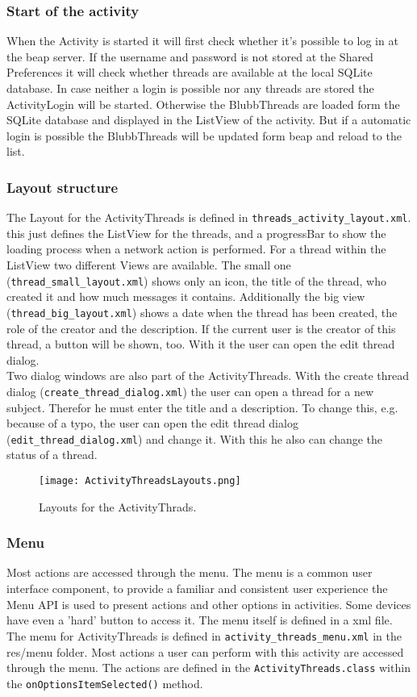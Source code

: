 \documentclass[12pt,a4paper,oneside]{report}
\newcommand{\code}[1]{\lstinline{#1}}
\begin{document}
\subsubsection{Start of the activity}
When the Activity is started it will first check whether it's possible to log in at the beap server. If the username and password is not stored at the Shared Preferences it will check whether threads are available at the local SQLite database. In case neither a login is possible nor any threads are stored the ActivityLogin will be started. Otherwise the BlubbThreads are loaded form the SQLite database and displayed in the ListView of the activity. But if a automatic login is possible the BlubbThreads will be updated form beap and reload to the list.

\subsubsection{Layout structure}
The Layout for the ActivityThreads is defined in \code{threads_activity_layout.xml}.
this just defines the ListView for the threads, and a progressBar to show the loading process when a network action is performed. For a thread within the ListView two different Views are available. The small one (\code{thread_small_layout.xml}) shows only an icon, the title of the thread, who created it and how much messages it contains. Additionally the big view (\code{thread_big_layout.xml}) shows a date when the thread has been created, the role of the creator and the description. If the current user is the creator of this thread, a button will be shown, too. With it the user can open the edit thread dialog. \\
Two dialog windows are also part of the ActivityThreads. With the create thread dialog (\code{create_thread_dialog.xml}) the user can open a thread for a new subject. Therefor he must enter the title and a description. To change this, e.g. because of a typo, the user can open the edit thread dialog (\code{edit_thread_dialog.xml}) and change it. With this he also can change the status of a thread. 

\begin{figure}[!ht]
	\centering
    \texttt{[image: ActivityThreadsLayouts.png]}
	\caption{Layouts for the ActivityThrads.}
\end{figure}


\subsubsection{Menu}
Most actions are accessed through the menu. The menu is a common user interface component, to provide a familiar and consistent user experience the Menu API is used to present actions and other options in activities\citep{aDefMenu}. Some devices have even a 'hard' button to access it. The menu itself is defined in a xml file. The menu for ActivityThreads is defined in \code{activity_threads_menu.xml} in the res/menu folder.
Most actions a user can perform with this activity are accessed through the menu. The actions are defined in the \code{ActivityThreads.class} within the \code{onOptionsItemSelected()} method.
\end{document}
